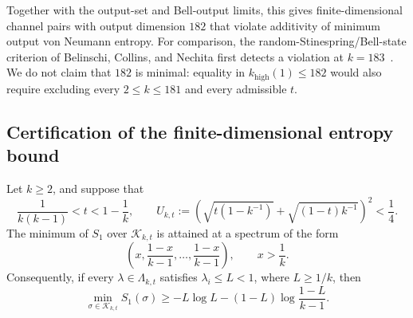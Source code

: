 Together with the output-set and Bell-output limits, this gives
finite-dimensional channel pairs with output dimension $182$ that
violate additivity of minimum output von Neumann entropy. For comparison,
the random-Stinespring/Bell-state criterion of Belinschi, Collins, and
Nechita first detects a violation at $k=183$~\cite{Belinschi_2016}.
We do not claim that $182$ is minimal: equality in
$k_{\mathrm{high}}(1)\leq182$ would also require excluding every
$2\leq k\leq181$ and every admissible $t$.

\subsection{Certification of the finite-dimensional entropy bound}
\label{app:k182-certificate}

\begin{lemma}
\label{lem:finite-k-entropy-reduction}
Let $k\geq2$, and suppose that
\begin{equation}
 \frac1{k(k-1)}<t<1-\frac1k,
 \qquad
 U_{k,t}:=\left(\sqrt{t(1-k^{-1})}
                  +\sqrt{(1-t)k^{-1}}\right)^2<\frac14.
\end{equation}
The minimum of $S_1$ over $\mathscr K_{k,t}$ is attained at a
spectrum of the form
\begin{equation}
 \left(x,\frac{1-x}{k-1},\ldots,\frac{1-x}{k-1}\right),
 \qquad x>\frac1k.
\end{equation}
Consequently, if every $\lambda\in\Lambda_{k,t}$ satisfies
$\lambda_i\leq L<1$, where $L\geq1/k$, then
\begin{equation}\label{eq:finite-k-entropy-bound}
 \min_{\sigma\in\mathscr K_{k,t}}S_1(\sigma)
 \geq-L\log L-(1-L)\log\frac{1-L}{k-1}.
\end{equation}
\end{lemma}

